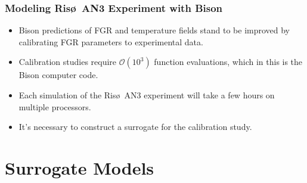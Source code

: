 \documentclass{beamer}
\begin{document}
\begin{frame}
\frametitle{Modeling Ris\o~AN3 Experiment with Bison}

\begin{itemize}
  \item Bison predictions of FGR and temperature fields stand to be improved by calibrating FGR parameters to experimental data.
  \item Calibration studies require $\mathcal{O}(10^3)$ function evaluations, which in this is the Bison computer code.
  \item Each simulation of the Ris\o~AN3 experiment will take a few hours on multiple processors.
  \item It's necessary to construct a surrogate for the calibration study. 
\end{itemize}

\end{frame}

\section{Surrogate Models}

\end{document}
